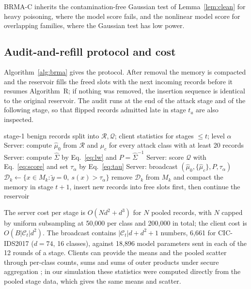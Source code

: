 \documentclass[pdflatex,sn-mathphys-num]{sn-jnl}
\theoremstyle{thmstyleone}
\theoremstyle{thmstylethree}
\begin{document}
BRMA-C inherits the contamination-free Gaussian test of Lemma~\ref{lem:clean} for heavy poisoning, where the model score fails, and the nonlinear model score for overlapping families, where the Gaussian test has low power.

\subsection{Audit-and-refill protocol and cost}
Algorithm~\ref{alg:brma} gives the protocol. After removal the memory is compacted and the reservoir fills the freed slots with the next incoming records before it resumes Algorithm~R; if nothing was removed, the insertion sequence is identical to the original reservoir. The audit runs at the end of the attack stage and of the following stage, so that flipped records admitted late in stage $t_a$ are also inspected.

\begin{algorithm}[htbp]
\caption{Benign-Reference Memory Audit at the end of stage $t$}\label{alg:brma}
\begin{algorithmic}[1]
\Require stage-1 benign records split into $\mathcal{R},\mathcal{Q}$; client statistics for stages $\le t$; level $\alpha$
\State Server: compute $\hat\mu_0$ from $\mathcal{R}$ and $\hat\mu_c$ for every attack class with at least 20 records
\State Server: compute $\hat\Sigma$ by Eq.~\eqref{eq:lw} and $P=\hat\Sigma^{-1}$
\State Server: score $\mathcal{Q}$ with Eq.~\eqref{eq:score} and set $\tau_\alpha$ by Eq.~\eqref{eq:tau}
\State Server: broadcast $(\hat\mu_0,\{\hat\mu_c\},P,\tau_\alpha)$
  \State $\mathcal{D}_k\gets\{x\in M_k:\tilde y=0,\ s(x)>\tau_\alpha\}$
  \State remove $\mathcal{D}_k$ from $M_k$ and compact the memory
  \State in stage $t+1$, insert new records into free slots first, then continue the reservoir
\EndFor
\end{algorithmic}
\end{algorithm}

The server cost per stage is $O(Nd^2+d^3)$ for $N$ pooled records, with $N$ capped by uniform subsampling at 50{,}000 per class and 200{,}000 in total; the client cost is $O(B|\mathcal{C}_t|d^2)$. The broadcast contains $|\mathcal{C}_t|d+d^2+1$ numbers, 6{,}661 for CIC-IDS2017 ($d=74$, 16 classes), against 18{,}896 model parameters sent in each of the 12 rounds of a stage. Clients can provide the means and the pooled scatter through per-class counts, sums and sums of outer products under secure aggregation \cite{kairouz}; in our simulation these statistics were computed directly from the pooled stage data, which gives the same means and scatter.
\end{document}
